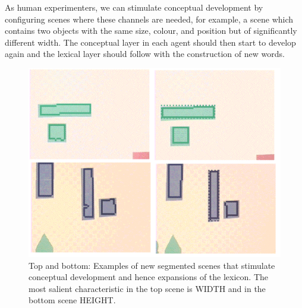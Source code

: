 As human experimenters, we can stimulate conceptual 
development by configuring scenes where these
channels are needed, for example, a scene 
which contains two objects with the same size, colour, 
and position but of significantly different width. The 
conceptual layer in each agent
should then start to develop again
and the lexical layer should follow with the 
construction of new words. 
\begin{figure}
\begin{center}
\includegraphics[width=0.8\columnwidth]{chap7/figs/plate-13}
\end{center}
\caption{ Top and bottom: Examples of new segmented scenes that stimulate conceptual development
and hence expansions of the lexicon. The most salient characteristic in the top scene is WIDTH and in the bottom 
scene HEIGHT.}
\label{fig:plate-13}
\end{figure}

